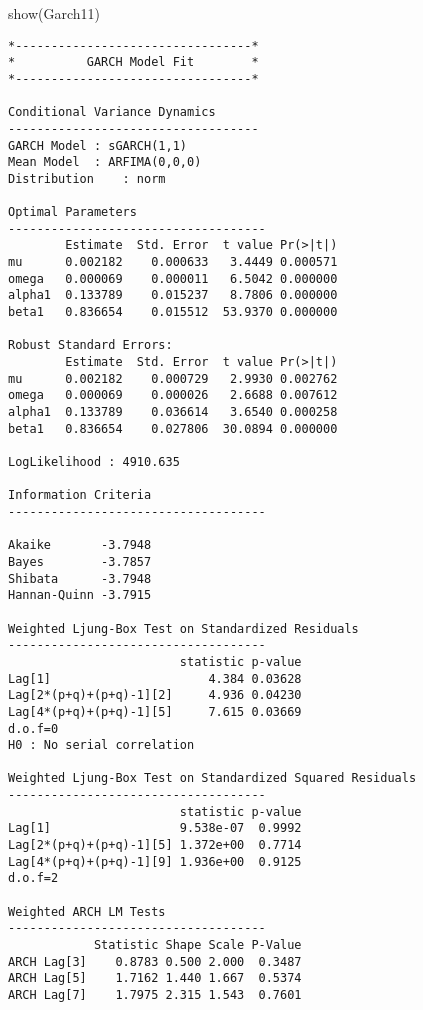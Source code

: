 \documentclass[
  ignorenonframetext,
]{beamer}
\newenvironment{Shaded}{\begin{snugshade}}{\end{snugshade}}
\newcommand{\FunctionTok}[1]{\textcolor[rgb]{0.00,0.00,0.00}{#1}}
\newcommand{\NormalTok}[1]{#1}
\begin{document}
\begin{frame}[fragile]
\begin{Shaded}
\begin{Highlighting}[]
\FunctionTok{show}\NormalTok{(Garch11)}
\end{Highlighting}
\end{Shaded}

\begin{verbatim}
*---------------------------------*
*          GARCH Model Fit        *
*---------------------------------*

Conditional Variance Dynamics   
-----------------------------------
GARCH Model : sGARCH(1,1)
Mean Model  : ARFIMA(0,0,0)
Distribution    : norm 

Optimal Parameters
------------------------------------
        Estimate  Std. Error  t value Pr(>|t|)
mu      0.002182    0.000633   3.4449 0.000571
omega   0.000069    0.000011   6.5042 0.000000
alpha1  0.133789    0.015237   8.7806 0.000000
beta1   0.836654    0.015512  53.9370 0.000000

Robust Standard Errors:
        Estimate  Std. Error  t value Pr(>|t|)
mu      0.002182    0.000729   2.9930 0.002762
omega   0.000069    0.000026   2.6688 0.007612
alpha1  0.133789    0.036614   3.6540 0.000258
beta1   0.836654    0.027806  30.0894 0.000000

LogLikelihood : 4910.635 

Information Criteria
------------------------------------
                    
Akaike       -3.7948
Bayes        -3.7857
Shibata      -3.7948
Hannan-Quinn -3.7915

Weighted Ljung-Box Test on Standardized Residuals
------------------------------------
                        statistic p-value
Lag[1]                      4.384 0.03628
Lag[2*(p+q)+(p+q)-1][2]     4.936 0.04230
Lag[4*(p+q)+(p+q)-1][5]     7.615 0.03669
d.o.f=0
H0 : No serial correlation

Weighted Ljung-Box Test on Standardized Squared Residuals
------------------------------------
                        statistic p-value
Lag[1]                  9.538e-07  0.9992
Lag[2*(p+q)+(p+q)-1][5] 1.372e+00  0.7714
Lag[4*(p+q)+(p+q)-1][9] 1.936e+00  0.9125
d.o.f=2

Weighted ARCH LM Tests
------------------------------------
            Statistic Shape Scale P-Value
ARCH Lag[3]    0.8783 0.500 2.000  0.3487
ARCH Lag[5]    1.7162 1.440 1.667  0.5374
ARCH Lag[7]    1.7975 2.315 1.543  0.7601


\end{verbatim}
\end{frame}
\end{document}
